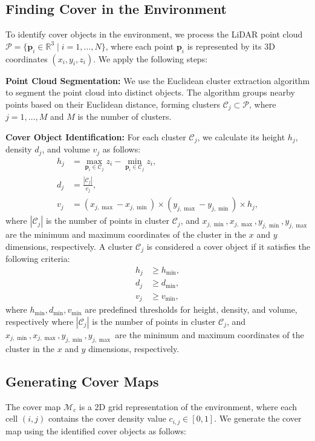 \subsection{Finding Cover in the Environment}
To identify cover objects in the environment, we process the LiDAR point cloud $\mathcal{P} = \{\mathbf{p}_i \in \mathbb{R}^3 \mid i = 1, \dots, N\}$, where each point $\mathbf{p}_i$ is represented by its 3D coordinates $(x_i, y_i, z_i)$. We apply the following steps:

\textbf{Point Cloud Segmentation:} We use the Euclidean cluster extraction algorithm to segment the point cloud into distinct objects. The algorithm groups nearby points based on their Euclidean distance, forming clusters $\mathcal{C}_j \subset \mathcal{P}$, where $j = 1, \dots, M$ and $M$ is the number of clusters.

\textbf{Cover Object Identification:} For each cluster $\mathcal{C}_j$, we calculate its height $h_j$, density $d_j$, and volume $v_j$ as follows:
\begin{align}
h_j &= \max_{\mathbf{p}_i \in \mathcal{C}_j} z_i - \min_{\mathbf{p}_i \in \mathcal{C}_j} z_i, \\
d_j &= \frac{|\mathcal{C}_j|}{v_j}, \\
v_j &= (x_{j,\max} - x_{j,\min}) \times (y_{j,\max} - y_{j,\min}) \times h_j,
\end{align}
where $|\mathcal{C}_j|$ is the number of points in cluster $\mathcal{C}_j$, and $x_{j,\min}, x_{j,\max}, y_{j,\min}, y_{j,\max}$ are the minimum and maximum coordinates of the cluster in the $x$ and $y$ dimensions, respectively. A cluster $\mathcal{C}_j$ is considered a cover object if it satisfies the following criteria:
\begin{align}
h_j &\geq h_{\min}, \\
d_j &\geq d_{\min}, \\
v_j &\geq v_{\min},
\end{align}
where $h_{\min}, d_{\min}, v_{\min}$ are predefined thresholds for height, density, and volume, respectively where $|\mathcal{C}_j|$ is the number of points in cluster $\mathcal{C}_j$, and $x_{j,\min}, x_{j,\max}, y_{j,\min}, y_{j,\max}$ are the minimum and maximum coordinates of the cluster in the $x$ and $y$ dimensions, respectively.

\subsection{Generating Cover Maps}
The cover map $\mathcal{M}_c$ is a 2D grid representation of the environment, where each cell $(i, j)$ contains the cover density value $c_{i,j} \in [0, 1]$. We generate the cover map using the identified cover objects as follows:

